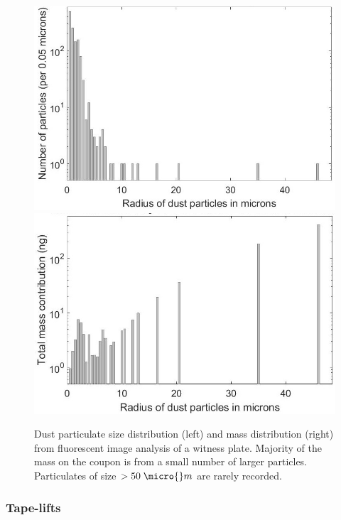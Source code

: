 \begin{figure}[hbt!]
    \centering
    \includegraphics[scale=0.46]{Chapter_3/Figures/ParticlesByRadiusLogScale.jpg}
    \includegraphics[scale=0.49]{Chapter_3/Figures/MassContributionLogScale.jpg}
    \caption[Dust particulate size and mass distribution from fluorescent image analysis of sample witness plates.]
    {Dust particulate size distribution (left) and mass distribution (right) from fluorescent image analysis of a witness plate. Majority of the mass on the coupon is from a small number of larger particles. Particulates of size $>50 \; \micro{}m$ are rarely recorded.}
    \label{fig:dust_particle}
\end{figure}
%


\subsubsection{Tape-lifts}

